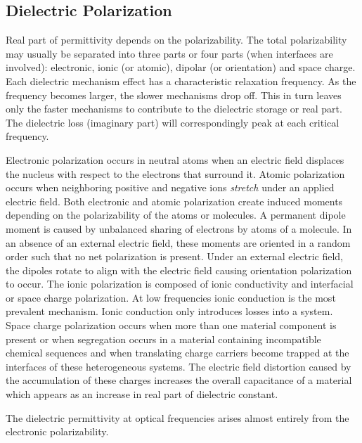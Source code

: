 \documentclass[%
 aip,
 amsmath,amssymb,
 reprint, floatfix%
]{revtex4-1}
\begin{document}
    \subsection{Dielectric Polarization}
    Real part of permittivity depends on the polarizability. The total polarizability may usually be separated into three parts or four parts (when interfaces are involved): electronic, ionic (or atomic), dipolar (or orientation) and space charge. Each dielectric mechanism effect has a characteristic relaxation frequency. As the frequency becomes larger, the slower mechanisms drop off. This in turn leaves only the faster mechanisms to contribute to the dielectric storage or real part. The dielectric loss (imaginary part) will correspondingly peak at each critical frequency.
    \par
    Electronic polarization occurs in neutral atoms when an electric field displaces the nucleus with respect to the electrons that surround it. Atomic polarization occurs when neighboring positive and negative ions \textit{stretch} under an applied electric field. Both electronic and atomic polarization create induced moments depending on the polarizability of the atoms or molecules. A permanent dipole moment is caused by unbalanced sharing of electrons by atoms of a molecule. In an absence of an external electric field, these moments are oriented in a random order such that no net polarization is present. Under an external electric field, the dipoles rotate to align with the electric field causing orientation polarization to occur. The ionic polarization is composed of ionic conductivity and interfacial or space charge polarization. At low frequencies ionic conduction is the most prevalent mechanism. Ionic conduction only introduces losses into a system. Space charge polarization occurs when more than one material component is present or when segregation occurs in a material containing incompatible chemical sequences and when translating charge carriers become trapped at the interfaces of these heterogeneous systems. The electric field distortion caused by the accumulation of these charges increases the overall capacitance of a material which appears as an increase in real part of dielectric constant.
    \par
    The dielectric permittivity at optical frequencies arises almost entirely from the electronic polarizability.
\end{document}
